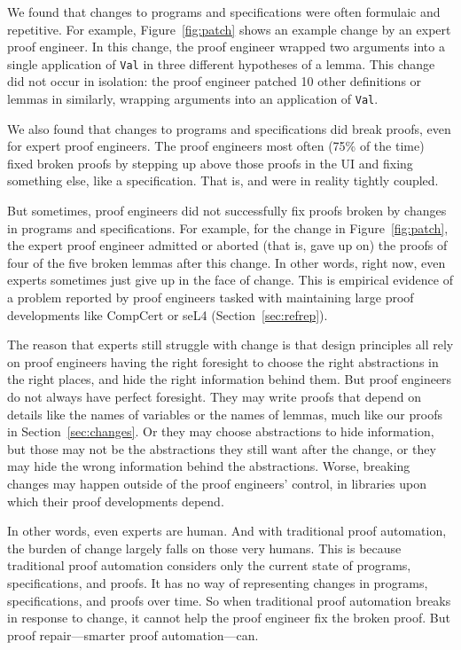 We found that changes to programs and specifications were often formulaic and repetitive.
For example, Figure~\ref{fig:patch} shows an example change by an expert proof engineer.
In this change, the proof engineer wrapped two arguments into a single application of \lstinline{Val}
in three different hypotheses of a lemma.
This change did not occur in isolation: the proof engineer patched 10 other definitions or lemmas
in similarly, wrapping arguments into an application of
\lstinline{Val}.

We also found that changes to programs and specifications did break proofs, even for expert proof engineers.
The proof engineers most often (75\% of the time) fixed broken proofs by stepping 
up above those proofs in the UI and fixing something else, like a specification.
That is,  and  were in reality tightly coupled.

But sometimes, proof engineers did not successfully fix proofs broken by changes in programs and specifications.
For example, for the change in Figure~\ref{fig:patch},
the expert proof engineer admitted or aborted (that is, gave up on) the proofs of four of the five
broken lemmas after this change.
In other words, right now, even experts sometimes just give up in the face of change.
This is empirical evidence of a problem reported by proof engineers
tasked with maintaining large proof developments
like CompCert or seL4 (Section~\ref{sec:refrep}).

The reason that experts still struggle with change is that
design principles all rely on proof engineers having the right foresight to choose the 
right abstractions in the right places, and hide the right information behind them.
But proof engineers do not always have perfect foresight.
They may write proofs that depend on details like the names of variables or the names of lemmas,
much like our proofs in Section~\ref{sec:changes}.
Or they may choose abstractions to hide information, but those may not be the abstractions they still want after the change,
or they may hide the wrong information behind the abstractions.
Worse, breaking changes may happen outside of the proof engineers' control,
in libraries upon which their proof developments depend.

In other words, even experts are human.
And with traditional proof automation, the burden of change largely falls on those very humans.
This is because traditional proof automation considers only the current state of programs, specifications, and proofs.
It has no way of representing changes in programs, specifications, and proofs over time.
So when traditional proof automation breaks in response to change, it cannot help the proof engineer fix the broken proof.
But proof repair---smarter proof automation---can.

